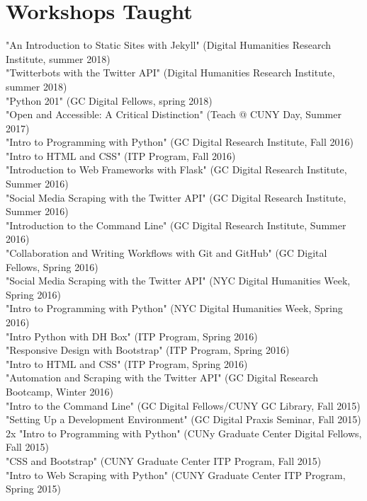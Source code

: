 \documentclass[11pt]{article}
\begin{document}
\section*{Workshops Taught}
\label{sec:orgheadline10}
"An Introduction to Static Sites with Jekyll" (Digital Humanities Research Institute, summer 2018)\\
"Twitterbots with the Twitter API" (Digital Humanities Research Institute, summer 2018)\\
"Python 201" (GC Digital Fellows, spring 2018)\\
"Open and Accessible: A Critical Distinction" (Teach @ CUNY Day, Summer 2017)\\
"Intro to Programming with Python" (GC Digital Research Institute, Fall 2016)\\
"Intro to HTML and CSS" (ITP Program, Fall 2016)\\
"Introduction to Web Frameworks with Flask" (GC Digital Research Institute, Summer 2016)\\
"Social Media Scraping with the Twitter API" (GC Digital Research Institute, Summer 2016)\\
"Introduction to the Command Line" (GC Digital Research Institute, Summer 2016)\\
"Collaboration and Writing Workflows with Git and GitHub" (GC Digital Fellows, Spring 2016)\\
"Social Media Scraping with the Twitter API" (NYC Digital Humanities Week, Spring 2016)\\
"Intro to Programming with Python" (NYC Digital Humanities Week, Spring 2016)\\
"Intro Python with DH Box" (ITP Program, Spring 2016)\\
"Responsive Design with Bootstrap" (ITP Program, Spring 2016)\\
"Intro to HTML and CSS" (ITP Program, Spring 2016)\\
"Automation and Scraping with the Twitter API" (GC Digital Research Bootcamp, Winter 2016)\\
"Intro to the Command Line" (GC Digital Fellows/CUNY GC Library, Fall 2015)\\
"Setting Up a Development Environment" (GC Digital Praxis Seminar, Fall 2015)\\
2x "Intro to Programming with Python" (CUNy Graduate Center Digital Fellows, Fall 2015)\\
"CSS and Bootstrap" (CUNY Graduate Center ITP Program, Fall 2015)\\
"Intro to Web Scraping with Python" (CUNY Graduate Center ITP Program, Spring 2015)\\
\end{document}
